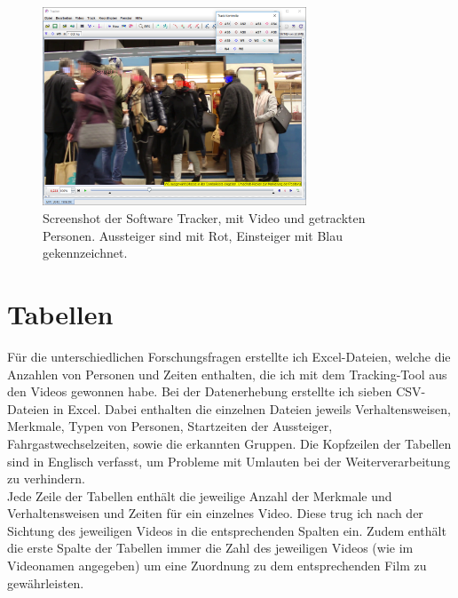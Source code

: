\begin{figure}[H]
	\centering
		\includegraphics[width=0.7\textwidth]{pictures/data_extraction/tracking/trackExample.png}
	\caption{Screenshot der Software \textsf{Tracker}, mit Video und getrackten Personen. Aussteiger sind mit Rot, Einsteiger mit Blau gekennzeichnet.}
	\label{fig:tracking}
\end{figure}
\section{Tabellen} \label{Tabellen}
Für die unterschiedlichen Forschungsfragen erstellte ich Excel-Dateien, welche die Anzahlen von Personen und Zeiten enthalten, die ich mit dem Tracking-Tool aus den Videos gewonnen habe. Bei der Datenerhebung erstellte ich sieben CSV-Dateien in Excel. Dabei enthalten die einzelnen Dateien jeweils  Verhaltensweisen, Merkmale, Typen von Personen, Startzeiten der Aussteiger, Fahrgastwechselzeiten, sowie die erkannten Gruppen. Die Kopfzeilen der Tabellen sind in Englisch verfasst, um Probleme mit Umlauten bei der Weiterverarbeitung zu verhindern. \\
Jede Zeile der Tabellen enthält die jeweilige Anzahl der Merkmale und Verhaltensweisen und Zeiten für ein einzelnes Video. Diese trug ich nach der Sichtung des jeweiligen Videos in die entsprechenden Spalten ein. Zudem enthält die erste Spalte der Tabellen immer die Zahl des jeweiligen Videos (wie im Videonamen angegeben) um eine Zuordnung zu dem entsprechenden Film zu gewährleisten.
